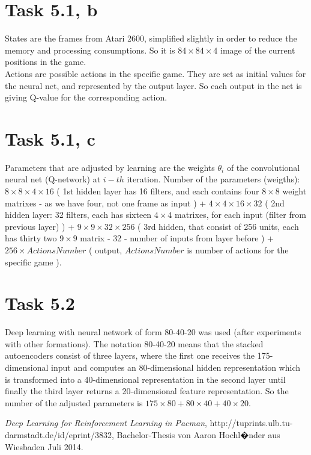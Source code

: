 \documentclass[english]{scrartcl}
\begin{document}
\section*{Task 5.1, b}
States are the frames from Atari 2600, simplified slightly in order to reduce the memory and processing consumptions. So it is $84\times84\times4$ image of the current positions in the game. 
\\Actions are possible actions in the specific game. They are set as initial values for the neural net, and represented by the output layer. So each output in the net is giving Q-value for the corresponding action.

\section*{Task 5.1, c}
Parameters that are adjusted by learning are the weights $\theta_{i}$ of the convolutional neural net (Q-network) at $i-th$ iteration. Number of the parameters (weigths): $8\times 8\times 4 \times 16$ ( 1st hidden layer has 16 filters, and each contains four $8\times 8$ weight matrixes - as we have four, not one frame as input ) + $4\times 4\times 16 \times 32$ ( 2nd hidden layer: 32 filters, each has sixteen $4\times 4$ matrixes, for each input (filter from previous layer) ) + $9\times 9\times 32\times 256$ ( 3rd hidden, that consist of 256 units, each has thirty two $9\times 9$ matrix - 32 - number of inputs from layer before ) + $256\times ActionsNumber$ ( output, $ActionsNumber$ is number of actions for the specific game ).

\section*{Task 5.2}
\cite{deep-learning}
Deep learning with neural network of form 80-40-20 was used (after experiments with other formations). The notation 80-40-20 means that the stacked autoencoders consist of three layers, where
the first one receives the 175-dimensional input and computes an 80-dimensional hidden representation which is transformed into a 40-dimensional representation in the second layer until finally the third layer returns a 20-dimensional feature representation. So the number of the adjusted parameters is $175\times 80 + 80 \times 40 + 40 \times 20$.

\begin{thebibliography}{9}

  \emph{Deep Learning for Reinforcement Learning in Pacman},
   http://tuprints.ulb.tu-darmstadt.de/id/eprint/3832,
  Bachelor-Thesis von Aaron Hochl�nder aus Wiesbaden
  Juli 2014.

\end{thebibliography}
\end{document}

